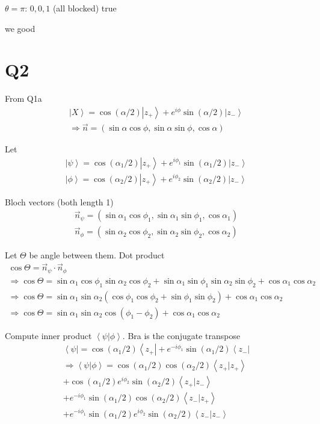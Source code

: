 \documentclass[
]{article}
\providecommand{\ket}[1]{\left\lvert #1 \right\rangle}
\providecommand{\bra}[1]{\left\langle #1 \right\rvert}
\providecommand{\braket}[1]{\left\langle #1 \right\rangle}
\providecommand{\Rarr}{\Rightarrow}
\begin{document}
\(\theta=\pi\): \(0,0,1\) (all blocked) true

we good

\section{Q2}
\begin{center}\end{center}

From Q1a
\begin{gather*}
	\ket{X}=\cos(\alpha/2)\ket{z_+}+e^{i\phi}\sin(\alpha/2)\ket{z_-}\\
	\Rarr \vec{n}=(\sin\alpha\cos\phi,\sin\alpha\sin\phi,\cos\alpha)
\end{gather*}

Let
\begin{gather*}
	\ket{\psi}=\cos(\alpha_1/2)\ket{z_+}+e^{i\phi_1}\sin(\alpha_1/2)\ket{z_-}\\
	\ket{\phi}=\cos(\alpha_2/2)\ket{z_+}+e^{i\phi_2}\sin(\alpha_2/2)\ket{z_-}
\end{gather*}

Bloch vectors (both length 1)
\begin{gather*}
	\vec{n}_\psi=(\sin\alpha_1\cos\phi_1,\sin\alpha_1\sin\phi_1,\cos\alpha_1)\\
	\vec{n}_\phi=(\sin\alpha_2\cos\phi_2,\sin\alpha_2\sin\phi_2,\cos\alpha_2)
\end{gather*}

Let \(\Theta\) be angle between them. Dot product
\begin{gather*}
	\cos\Theta=\vec{n}_\psi\cdot\vec{n}_\phi\\
	\Rarr \cos\Theta=\sin\alpha_1\cos\phi_1\sin\alpha_2\cos\phi_2+\sin\alpha_1\sin\phi_1\sin\alpha_2\sin\phi_2+\cos\alpha_1\cos\alpha_2\\
	\Rarr \cos\Theta=\sin\alpha_1\sin\alpha_2(\cos\phi_1\cos\phi_2+\sin\phi_1\sin\phi_2)+\cos\alpha_1\cos\alpha_2\\
	\Rarr \cos\Theta=\sin\alpha_1\sin\alpha_2\cos(\phi_1-\phi_2)+\cos\alpha_1\cos\alpha_2
\end{gather*}

Compute inner product \(\braket{\psi|\phi}\). Bra is the conjugate transpose
\begin{gather*}
	\bra{\psi}=\cos(\alpha_1/2)\bra{z_+}+e^{-i\phi_1}\sin(\alpha_1/2)\bra{z_-}\\
	\Rarr\braket{\psi|\phi}=\cos(\alpha_1/2)\cos(\alpha_2/2)\braket{z_+|z_+}\\
	+\cos(\alpha_1/2)e^{i\phi_2}\sin(\alpha_2/2)\braket{z_+|z_-}\\
	+e^{-i\phi_1}\sin(\alpha_1/2)\cos(\alpha_2/2)\braket{z_-|z_+}\\
	+e^{-i\phi_1}\sin(\alpha_1/2)e^{i\phi_2}\sin(\alpha_2/2)\braket{z_-|z_-}
\end{gather*}
\end{document}
